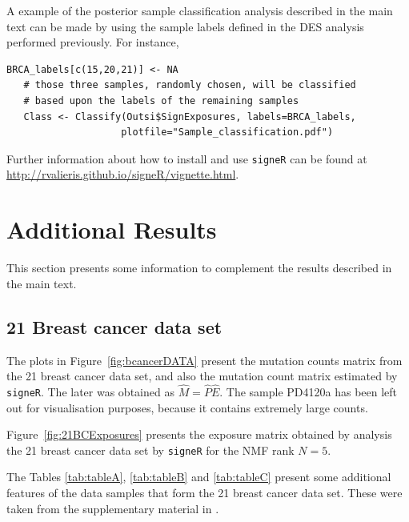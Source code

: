 \documentclass[11pt]{amsart}
\theoremstyle{definition}
\begin{document}
A example of the posterior sample classification analysis described in
the main text can be made by using the sample labels defined in the
DES analysis performed previously. For instance,
\begin{lstlisting}[]
   BRCA_labels[c(15,20,21)] <- NA 
   # those three samples, randomly chosen, will be classified
   # based upon the labels of the remaining samples
   Class <- Classify(Outsi$SignExposures, labels=BRCA_labels,
                    plotfile="Sample_classification.pdf")
\end{lstlisting}
Further information about how to install and use \texttt{signeR} can
be found at \\ 
\indent\indent\url{http://rvalieris.github.io/signeR/vignette.html}.

\section{Additional Results}
This section presents some information to complement the results
described in the main text. 

\subsection{21 Breast cancer data set}
The plots in Figure~\ref{fig:bcancerDATA} present the mutation
counts matrix from the 21 breast cancer data set, and also the
mutation count matrix estimated by \texttt{signeR}. The later was
obtained as $\widehat M = \widehat P\widehat E$. The sample
PD4120a has been left out for visualisation purposes, because it
contains extremely large counts.


Figure~\ref{fig:21BCExposures} presents the exposure matrix obtained
by analysis the 21 breast cancer data set by \texttt{signeR} for the
NMF rank $N=5$.


The Tables \ref{tab:tableA}, \ref{tab:tableB} and \ref{tab:tableC}
present some additional features of the data samples that form the 21
breast cancer data set. These were taken from the supplementary
material in \cite{NCellFull}. 
\end{document}
